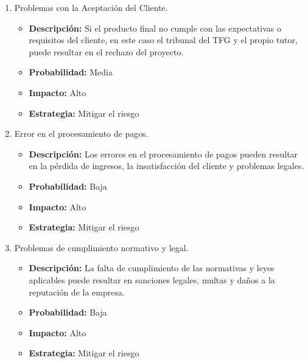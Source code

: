 \begin{enumerate}
\begin{itemize}
    \end{itemize}
    \item Problemas con la Aceptación del Cliente.
    \begin{itemize}
        \item \textbf{Descripción:} Si el producto final no cumple con las expectativas o requisitos del cliente, en este caso el tribunal del TFG y el propio tutor, puede resultar en el rechazo del proyecto.
        \item \textbf{Probabilidad:} Media
        \item \textbf{Impacto:} Alto
        \item \textbf{Estrategia:} Mitigar el riesgo
    \end{itemize}
    \item Error en el procesamiento de pagos.
    \begin{itemize}
        \item \textbf{Descripción:} Los errores en el procesamiento de pagos pueden resultar en la pérdida de ingresos, la insatisfacción del cliente y problemas legales.
        \item \textbf{Probabilidad:} Baja
        \item \textbf{Impacto:} Alto
        \item \textbf{Estrategia:} Mitigar el riesgo
    \end{itemize}
    \item Problemas de cumplimiento normativo y legal.
    \begin{itemize}
        \item \textbf{Descripción:} La falta de cumplimiento de las normativas y leyes aplicables puede resultar en sanciones legales, multas y daños a la reputación de la empresa.
        \item \textbf{Probabilidad:} Baja
        \item \textbf{Impacto:} Alto
        \item \textbf{Estrategia:} Mitigar el riesgo
    \end{itemize}
\end{enumerate}


